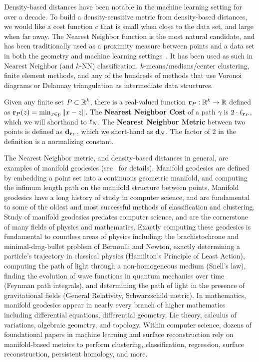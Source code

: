 Density-based distances have been notable in the machine learning setting
for over a decade. To build a density-sensitive metric from density-based
distances, we would like a cost function $c$ that is small when close to
the data set, and large when far away. The Nearest Neighbor function is the
most natural candidate, and has been traditionally used as a proximity
measure between points and a data set in both the geometry and machine
learning settings~\cite{}. It has been used as such in Nearest Neighbor
(and $k$-NN) classification, $k$-means/medians/center clustering, finite
element methods, and any of the hundreds of methods that use Voronoi
diagrams or Delaunay triangulation as intermediate data structures.

\begin{definition} Given any finite set $P\subset \mathbb{R}^k$, there is a
real-valued function $\mathbf{r}_P: \mathbb{R}^k\to \mathbb{R}$ defined as
$\mathbf{r}_P(z) = \min_{x\in p} \|x-z\|$.  The \textbf{Nearest Neighbor Cost}
of a path $\gamma$ is $2 \cdot \ell_{\mathbf{r}_P}$, which we will shorthand to
$\ell_N$. The \textbf{Nearest Neighbor Metric} between two points is
defined as $\mathbf{d}_{\mathbf{r}_P}$, which we short-hand as $\mathbf{d}_N$.
The factor of $2$ in the definition is a normalizing constant.
\end{definition}

The Nearest Neighbor metric, and density-based distances in general, are
examples of manifold geodesics (see~\cite{} for details). Manifold
geodesics are defined by embedding a point set into a continuous geometric
manifold, and computing the infimum length path on the manifold structure
between points. Manifold geodesics have a long history of study in computer
science, and are fundamental to some of the oldest and most successful
methods of classification and clustering. Study of manifold geodesics
predates computer science, and are the cornerstone of many fields of
physics and mathematics. Exactly computing these geodesics is fundamental
to countless areas of physics including: the brachistochrone and
minimal-drag-bullet problem of Bernoulli and Newton, exactly determining a
particle's trajectory in classical physics (Hamilton's Principle of Least
Action), computing the path of light through a non-homogeneous medium
(Snell's law), finding the evolution of wave functions in quantum mechanics
over time (Feynman path integrals), and determining the path of light in
the presence of gravitational fields (General Relativity, Schwarzschild
metric). In mathematics, manifold geodesics appear in nearly every branch
of higher mathematics including differential equations, differential
geometry, Lie theory, calculus of variations, algebraic geometry, and
topology.  Within computer science, dozens of foundational papers in
machine learning and surface reconstruction rely on manifold-based metrics
to perform clustering, classification, regression, surface reconstruction,
persistent homology, and more.

